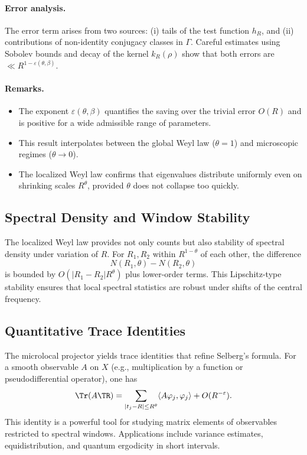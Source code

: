 \paragraph{Error analysis.}
The error term arises from two sources: (i) tails of the test function $h_R$, and (ii) contributions of non-identity conjugacy classes in $\Gamma$. Careful estimates using Sobolev bounds and decay of the kernel $k_R(\rho)$ show that both errors are $\ll R^{1-\varepsilon(\theta,\beta)}$.

\paragraph{Remarks.}
\begin{itemize}
\item The exponent $\varepsilon(\theta,\beta)$ quantifies the saving over the trivial error $O(R)$ and is positive for a wide admissible range of parameters.
\item This result interpolates between the global Weyl law ($\theta=1$) and microscopic regimes ($\theta\to 0$).
\item The localized Weyl law confirms that eigenvalues distribute uniformly even on shrinking scales $R^\theta$, provided $\theta$ does not collapse too quickly.
\end{itemize}

\subsection{Spectral Density and Window Stability}\label{subsec:spectral-density}

The localized Weyl law provides not only counts but also stability of spectral density under variation of $R$. For $R_1,R_2$ within $R^{1-\theta}$ of each other, the difference
\[
N(R_1,\theta) - N(R_2,\theta)
\]
is bounded by $O(|R_1-R_2|R^\theta)$ plus lower-order terms. This Lipschitz-type stability ensures that local spectral statistics are robust under shifts of the central frequency.

\subsection{Quantitative Trace Identities}\label{subsec:trace-identities}

The microlocal projector yields trace identities that refine Selberg’s formula. For a smooth observable $A$ on $X$ (e.g., multiplication by a function or pseudodifferential operator), one has
\[
\Tr(A\TR) = \sum_{|t_j-R|\le R^\theta} \langle A\varphi_j,\varphi_j\rangle + O(R^{-\varepsilon}).
\]
This identity is a powerful tool for studying matrix elements of observables restricted to spectral windows. Applications include variance estimates, equidistribution, and quantum ergodicity in short intervals.

